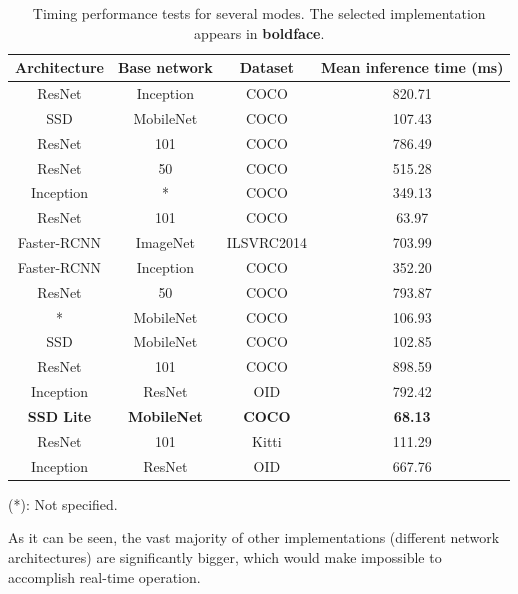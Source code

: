 	
	
	
	\begin{table}[h]
		\centering
		\begin{tabular}{|c|c|c|c|}
			\hline
			\textbf{Architecture} & \textbf{Base network} & \textbf{Dataset} & \textbf{Mean inference time} (ms) \\ \hline
			ResNet  & Inception  & COCO & 820.71 \\ \hline
			SSD  & MobileNet  & COCO & 107.43 \\ \hline
			ResNet  & 101  & COCO & 786.49 \\ \hline
			ResNet  & 50  & COCO & 515.28 \\ \hline
			Inception  & *  & COCO & 349.13 \\ \hline
			ResNet  & 101  & COCO & 63.97 \\ \hline
			Faster-RCNN  & ImageNet  & ILSVRC2014 & 703.99 \\ \hline
			Faster-RCNN  & Inception  & COCO & 352.20 \\ \hline
			ResNet  & 50  & COCO & 793.87 \\ \hline
			*  & MobileNet  & COCO & 106.93 \\ \hline
			SSD  & MobileNet  & COCO & 102.85 \\ \hline
			ResNet  & 101  & COCO & 898.59 \\ \hline
			Inception  & ResNet  & OID & 792.42 \\ \hline
			\textbf{SSD Lite}  & \textbf{MobileNet}  & \textbf{COCO} & \textbf{68.13} \\ \hline
			ResNet  & 101  & Kitti & 111.29 \\ \hline
			Inception  & ResNet  & OID & 667.76 \\ \hline
		\end{tabular}
		\caption{Timing performance tests for several modes. The selected implementation appears in \textbf{boldface}.}
		(*): Not specified.
		\label{tab:5_tests}
	\end{table}
		
	
	
	
	As it can be seen, the vast majority of other implementations (different network architectures) are significantly bigger, which would make impossible to accomplish real-time operation.\\
	
	
	
	
	
	
	
	
	
	